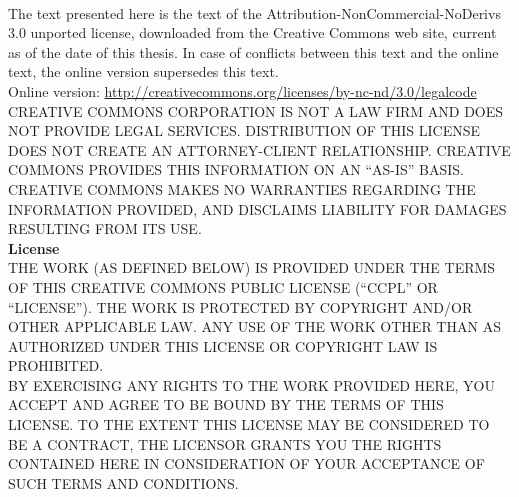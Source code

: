 \clearpage
\thispagestyle{empty}
\setcounter{secnumdepth}{0}
\label{sec:appendixL}
\\

The text presented here is the text of the Attribution-NonCommercial-NoDerivs
3.0 unported license, downloaded from the Creative Commons web site, current as
of the date of this thesis. In case of conflicts between this text and the
online text, the online version supersedes this text. \\

Online version: \url{http://creativecommons.org/licenses/by-nc-nd/3.0/legalcode} 
\\

CREATIVE COMMONS CORPORATION IS NOT A LAW FIRM AND DOES NOT PROVIDE LEGAL
SERVICES. DISTRIBUTION OF THIS LICENSE DOES NOT CREATE AN ATTORNEY-CLIENT
RELATIONSHIP. CREATIVE COMMONS PROVIDES THIS INFORMATION ON AN ``AS-IS'' BASIS.
CREATIVE COMMONS MAKES NO WARRANTIES REGARDING THE INFORMATION PROVIDED, AND
DISCLAIMS LIABILITY FOR DAMAGES RESULTING FROM ITS USE. \\

\textbf{License} \\

THE WORK (AS DEFINED BELOW) IS PROVIDED UNDER THE TERMS OF THIS CREATIVE COMMONS
PUBLIC LICENSE (``CCPL'' OR ``LICENSE''). THE WORK IS PROTECTED BY COPYRIGHT AND/OR
OTHER APPLICABLE LAW. ANY USE OF THE WORK OTHER THAN AS AUTHORIZED UNDER THIS
LICENSE OR COPYRIGHT LAW IS PROHIBITED.\\

BY EXERCISING ANY RIGHTS TO THE WORK PROVIDED HERE, YOU ACCEPT AND AGREE TO BE
BOUND BY THE TERMS OF THIS LICENSE. TO THE EXTENT THIS LICENSE MAY BE CONSIDERED
TO BE A CONTRACT, THE LICENSOR GRANTS YOU THE RIGHTS CONTAINED HERE IN
CONSIDERATION OF YOUR ACCEPTANCE OF SUCH TERMS AND CONDITIONS.\\

